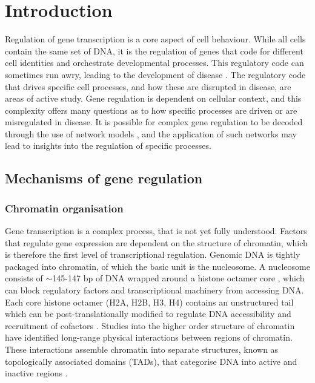 
\chapter{\label{chapter1_introduction}Introduction} 

\begingroup
\raggedright
\minitoc
\endgroup

\clearpage %






Regulation of gene transcription is a core aspect of cell behaviour. While all cells contain the same set of DNA, it is the regulation of genes that code for different cell identities and orchestrate developmental processes. This regulatory code can sometimes run awry, leading to the development of disease \citep{lee_transcriptional_2013, baxter_epigenetic_2014, thoms_transcriptional_2019}. The regulatory code that drives specific cell processes, and how these are disrupted in disease, are areas of active study. Gene regulation is dependent on cellular context, and this complexity offers many questions as to how specific processes are driven or are misregulated in disease. It is possible for complex gene regulation to be decoded through the use of network models \citep{levine_gene_2005}, and the application of such networks may lead to insights into the regulation of specific processes.


\section{Mechanisms of gene regulation}

\subsection{Chromatin organisation}

Gene transcription is a complex process, that is not yet fully understood. Factors that regulate gene expression are dependent on the structure of chromatin, which is therefore the first level of transcriptional regulation. Genomic DNA is tightly packaged into chromatin, of which the basic unit is the nucleosome. A nucleosome consists of $\sim$145-147 bp of DNA wrapped around a histone octamer core \citep{luger_crystal_1997}, which can block regulatory factors and transcriptional machinery from accessing DNA. Each core histone octamer (H2A, H2B, H3, H4) contains an unstructured tail which can be post-translationally modified to regulate DNA accessibility and recruitment of cofactors \citep{luger_histone_1998, quina_chromatin_2006}. Studies into the higher order structure of chromatin have identified long-range physical interactions between regions of chromatin. These interactions assemble chromatin into separate structures, known as topologically associated domains (TADs), that categorise DNA into active and inactive regions \citep{lieberman-aiden_comprehensive_2009, dixon_topological_2012}. 


